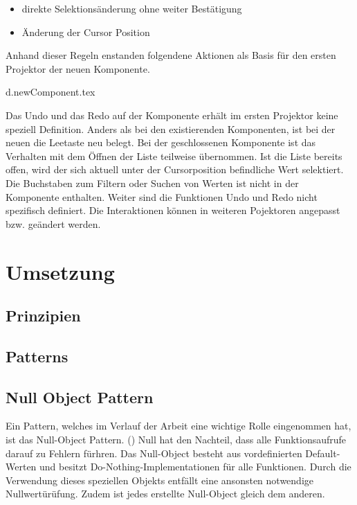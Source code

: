 \begin{itemize}
    \item direkte Selektionsänderung ohne weiter Bestätigung
    \item Änderung der Cursor Position
\end{itemize}

\noindent
Anhand dieser Regeln enstanden folgendene Aktionen als Basis für den ersten Projektor der neuen Komponente. 


\clearpage
{d.newComponent.tex}

Das Undo und das Redo auf der Komponente erhält im ersten Projektor keine speziell Definition.
Anders als bei den existierenden Komponenten, ist bei der neuen die Leetaste neu belegt. 
Bei der geschlossenen Komponente ist das Verhalten mit dem Öffnen der Liste teilweise übernommen.
Ist die Liste bereits offen, wird der sich aktuell unter der Cursorposition befindliche Wert selektiert.
Die Buchstaben zum Filtern oder Suchen von Werten ist nicht in der Komponente enthalten.
Weiter sind die Funktionen Undo und Redo nicht spezifisch definiert.
Die Interaktionen können in weiteren Pojektoren angepasst bzw. geändert werden.



\section{Umsetzung}



\subsection{Prinzipien}



\subsection{Patterns}

\subsection{Null Object Pattern}

Ein Pattern, welches im Verlauf der Arbeit eine wichtige Rolle eingenommen hat, ist das Null-Object Pattern.
(\cite{nullObjectPattern}) Null hat den Nachteil, dass alle Funktionsaufrufe darauf zu Fehlern fürhren.
Das Null-Object besteht aus vordefinierten Default-Werten und besitzt Do-Nothing-Implementationen für alle Funktionen.
Durch die Verwendung dieses speziellen Objekts entfällt eine ansonsten notwendige Nullwertürüfung.
Zudem ist jedes erstellte Null-Object gleich dem anderen.

